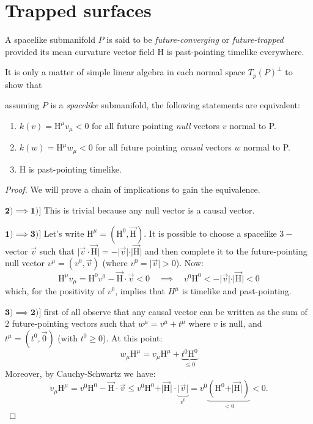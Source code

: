 \section{Trapped surfaces}

\begin{definition}
	\label{def:trapped-surface}
	A spacelike submanifold \(P\) is said to be \emph{future-converging} or \emph{future-trapped} provided its mean curvature vector field \(\mathrm{H}\) is past-pointing timelike everywhere.
\end{definition}

It is only a matter of simple linear algebra in each normal space \(T_p(P)^{\perp}\) to show that
\begin{lemma} \label{lemma:charact-trapped}
	assuming \(P\) is a \emph{spacelike} submanifold, the following statements are equivalent:
	\begin{enumerate}
		\item  \(k(v) =\mathrm{H}^{\mu} v_{\mu} < 0 \) for all future pointing \emph{null} vectors \(v\) normal to P.
		\item  \(k(w) =\mathrm{H}^{\mu} w_{\mu} < 0 \) for all future pointing \emph{causal} vectors \(w\) normal to P.
		\item \(\mathrm{H}\) is past-pointing timelike.
	\end{enumerate}
\end{lemma}

\begin{proof}
	We will prove a chain of implications to gain the equivalence.
	
	\(\mathbf{2) \implies 1)]}\) This is trivial because any null vector is a causal vector.
	
	\(\mathbf{1) \implies 3)]}\) Let's write \(\mathrm{H}^{\mu} = (\mathrm{H}^0, \vec{\mathrm{H}})\). It is possible to choose a spacelike \(3-\)vector \(\vec{v}\) such that \(\vert\vec{v}\cdot\vec{\mathrm{H}}\vert = - \vert\vec{v}\vert\cdot\vert\vec{\mathrm{H}}\vert\) and  then complete it to the future-pointing null vector \(v^{\mu} = (v^0, \vec{v})\) (where \(v^0 = \vert \vec{v}\vert > 0\)).
	Now:
	\[
	\mathrm{H}^{\mu}v_{\mu} = \mathrm{H}^0v^0 - \vec{\mathrm{H}}\cdot\vec{v} < 0 \quad \implies 
	\quad v^0 \mathrm{H}^0 < - \vert\vec{v}\vert\cdot\vert\vec{\mathrm{H}}\vert < 0
	\]
	which, for the positivity of \(v^0\), implies that \(H^{\mu}\) is timelike and past-pointing.
	
	\(\mathbf{3) \implies 2)]}\) first of all observe that any causal vector can be written as the sum of \(2\) future-pointing vectors such that \(w^{\mu}= v^{\mu} + t^{\mu}\) where \(v\) is null, and \(t^{\mu} = (t^0, \vec{0})\) (with \(t^0 \ge 0\)). At this point:
	\[
	w_{\mu}\mathrm{H}^{\mu} = v_{\mu}\mathrm{H}^{\mu} + \underbrace{t^0 \mathrm{H}^0}_{\le0}
	\]
	Moreover, by Cauchy-Schwartz we have:
	\[
	v_{\mu}\mathrm{H}^{\mu} = v^0 \mathrm{H}^0 - \vec{\mathrm{H}}\cdot\vec{v} \le v^0\mathrm{H}^0 +\vert \vec{\mathrm{H}}\vert\cdot\underbrace{\vert\vec{v}\vert}_{v^0} = v^0\underbrace{(\mathrm{H}^0 + \vert \vec{\mathrm{H}}\vert)}_{<0} < 0.
	\]
\end{proof}


